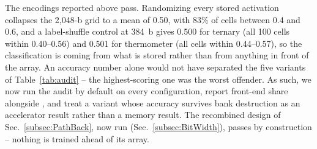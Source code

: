 The encodings reported above pass. Randomizing every stored
activation collapses the 2{,}048-b \signrp grid to a mean of 0.50,
with 83\% of cells between 0.4 and 0.6, and a label-shuffle control
at 384~b gives 0.500 for ternary (all 100 cells within 0.40--0.56) and
0.501 for thermometer (all cells within 0.44--0.57), so the
classification is coming from what is stored rather than from
anything in front of the array. An
accuracy number alone would not have separated the five variants of
Table~\ref{tab:audit} -- the highest-scoring one was the worst
offender. As such, we now run the audit by default on every
configuration, report front-end share alongside \auroc, and treat a
variant whose accuracy survives bank destruction as an accelerator
result rather than a memory result. The recombined design of
Sec.~\ref{subsec:PathBack}, now run (Sec.~\ref{subsec:BitWidth}),
passes by construction -- nothing is trained ahead of its array.

